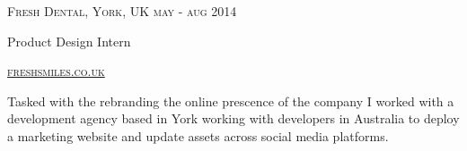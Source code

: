 {
  \textsc{\small{Fresh Dental, York, UK
      \hfill
          {\raggedleft
              may - aug 2014
          } \\
      }
  }
  {\raggedright\large {
    Product Design Intern
  } \\}

  \textsc{\small\href{http://www.freshsmiles.co.uk}{freshsmiles.co.uk}}

  \normalsize{\raggedright
    Tasked with the rebranding the online prescence of the company I worked with a development agency based in York working with developers in Australia to deploy a marketing website and update assets across social media platforms. 
  }
}
